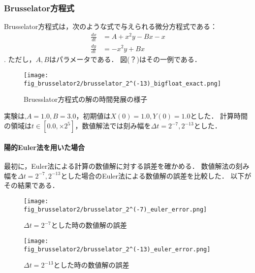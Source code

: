 \subsubsection{Brusselator方程式}
Brusselator方程式は，次のような式で与えられる微分方程式である：
\begin{align}
    \frac{dx}{dt} &= A + x^2y - Bx - x\\
    \frac{dy}{dt} &= -x^2y + Bx
\end{align}.
ただし，$A,B$はパラメータである．
図(？)はその一例である．
\begin{figure}[H]
    \centering
    \begin{minipage}[b]{0.9\columnwidth}
            \texttt{[image: fig\_brusselator2/brusselator\_2^(-13)\_bigfloat\_exact.png]}
    \end{minipage}
    \caption{Bruesslator方程式の解の時間発展の様子}
    \label{fig:brusselator}
\end{figure}
実験は,$A=1.0, B=3.0$，初期値は$X(0) = 1.0, Y(0) = 1.0$とした．
計算時間の領域は$t \in [0.0, \times 2^5]$，数値解法では刻み幅を$\Delta t =  2^{-7}, 2^{-13}$とした．
\paragraph*{陽的Euler法を用いた場合}
最初に，Euler法による計算の数値解に対する誤差を確かめる．
数値解法の刻み幅を$\Delta t = 2^{-7},2^{-13}$とした場合のEuler法による数値解の誤差を比較した．
以下がその結果である．
\begin{figure}[H]
    \centering
    \begin{minipage}[b]{0.49\columnwidth}
        \centering
        \texttt{[image: fig\_brusselator2/brusselator\_2^(-7)\_euler\_error.png]}
        \caption{$\Delta t = 2^{-7}$とした時の数値解の誤差}
        \label{fig:brusselator_2^(-7)_euler_error}
    \end{minipage}
    \begin{minipage}[b]{0.49\columnwidth}
        \centering
        \texttt{[image: fig\_brusselator2/brusselator\_2^(-13)\_euler\_error.png]}
        \caption{$\Delta t =  2^{-13}$とした時の数値解の誤差}
        \label{fig:brusselator_2^(-13)_euler_error}
    \end{minipage}
\end{figure}

